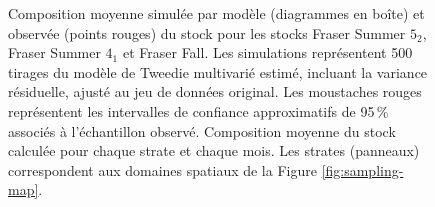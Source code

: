 \begin{figure}[htb]
    \centering
    \caption{Composition moyenne simulée par modèle (diagrammes en boîte) et observée (points rouges) du stock pour les stocks Fraser Summer $5_2$, Fraser Summer $4_1$ et Fraser Fall. Les simulations représentent 500 tirages du modèle de Tweedie multivarié estimé, incluant la variance résiduelle, ajusté au jeu de données original. Les moustaches rouges représentent les intervalles de confiance approximatifs de 95\,\% associés à l'échantillon observé. Composition moyenne du stock calculée pour chaque strate et chaque mois. Les strates (panneaux) correspondent aux domaines spatiaux de la Figure \ref{fig:sampling-map}.}
    \label{fig:posterior-stock3}
\end{figure}

